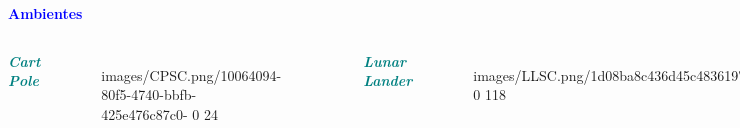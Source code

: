 \documentclass[aspectratio=169]{beamer}
\begin{document}
\begin{frame}{\textcolor{blue}{\textbf{Ambientes}}}
\begin{columns}
\textbf{\textcolor{teal}{\textit{Cart Pole}}}

\begin{figure}[H]
    \centering
    \vspace*{-0.25cm}
    {images/CPSC.png/10064094-80f5-4740-bbfb-425e476c87c0-}%
    {0}%
    {24}%
    \label{fig:GPC1}
\end{figure}

\begin{table}[H]
    \centering
    \vspace*{-0.2cm}
    \LARGE %
    \label{tab:outcartpole}
\end{table}
\vspace*{1.25cm}
 \vspace*{-.05cm}
\textbf{\textcolor{teal}{\textit{Lunar Lander}}}

\begin{figure}[H]
    \centering
     \vspace*{-.05cm}
    {images/LLSC.png/1d08ba8c436d45c4836197d017e10367pXCEhE5SPawIdiCa-}%
    {0}%
    {118}%
    \label{fig:GPC1}
\end{figure}


\end{columns}
\end{frame}
\end{document}
